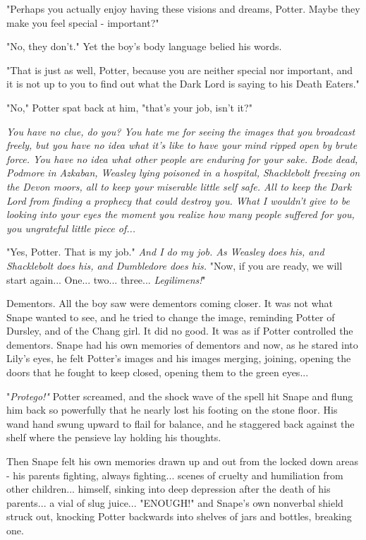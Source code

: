 \documentclass[a4paper,11pt]{article}
\begin{document}
"Perhaps you actually enjoy having these visions and dreams, Potter. Maybe they make you feel special - important?"

"No, they don't." Yet the boy's body language belied his words.

"That is just as well, Potter, because you are neither special nor important, and it is not up to you to find out what the Dark Lord is saying to his Death Eaters."

"No," Potter spat back at him, "that's your job, isn't it?"

\emph{You have no clue, do you? You hate me for seeing the images that you broadcast freely, but you have no idea what it's like to have your mind ripped open by brute force. You have no idea what other people are enduring for your sake. Bode dead, Podmore in Azkaban, Weasley lying poisoned in a hospital, Shacklebolt freezing on the Devon moors, all to keep your miserable little self safe. All to keep the Dark Lord from finding a prophecy that could destroy you. What I wouldn't give to be looking into your eyes the moment you realize how many people suffered for you, you ungrateful little piece of...}

"Yes, Potter. That is my job." \emph{And I do my job. As Weasley does his, and Shacklebolt does his, and Dumbledore does his.} "Now, if you are ready, we will start again... One... two... three... \emph{Legilimens!}"

Dementors. All the boy saw were dementors coming closer. It was not what Snape wanted to see, and he tried to change the image, reminding Potter of Dursley, and of the Chang girl. It did no good. It was as if Potter controlled the dementors. Snape had his own memories of dementors and now, as he stared into Lily's eyes, he felt Potter's images and his images merging, joining, opening the doors that he fought to keep closed, opening them to the green eyes...

"\emph{Protego!"} Potter screamed, and the shock wave of the spell hit Snape and flung him back so powerfully that he nearly lost his footing on the stone floor. His wand hand swung upward to flail for balance, and he staggered back against the shelf where the pensieve lay holding his thoughts.

Then Snape felt his own memories drawn up and out from the locked down areas - his parents fighting, always fighting... scenes of cruelty and humiliation from other children... himself, sinking into deep depression after the death of his parents... a vial of slug juice... "ENOUGH!" and Snape's own nonverbal shield struck out, knocking Potter backwards into shelves of jars and bottles, breaking one.
\end{document}
